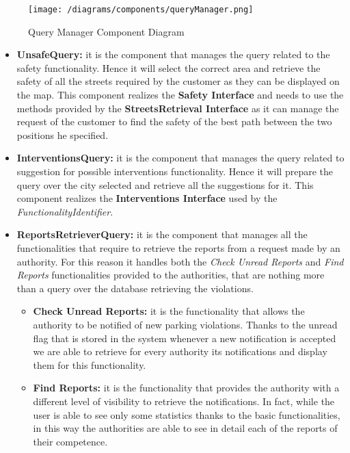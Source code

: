 			\begin{figure}[ht]
				\centering
				\texttt{[image: /diagrams/components/queryManager.png]}
				\caption{\label{fig:queryManagerComp} Query Manager Component Diagram}
			\end{figure}
		
			\begin{itemize}
				\item \textbf{UnsafeQuery:} it is the component that manages the query related to the safety functionality. Hence it will select the correct area and retrieve the safety of all the streets required by the customer as they can be displayed on the map. This component realizes the \textbf{Safety Interface} and needs to use the methods provided by the \textbf{StreetsRetrieval Interface} as it can manage the request of the customer to find the safety of the best path between the two positions he specified.
				
				\item \textbf{InterventionsQuery:} it is the component that manages the query related to suggestion for possible interventions functionality. Hence it will prepare the query over the city selected and retrieve all the suggestions for it. This component realizes the \textbf{Interventions Interface} used by the \emph{FunctionalityIdentifier}.
				
				\item \textbf{ReportsRetrieverQuery:} it is the component that manages all the functionalities that require to retrieve the reports from a request made by an authority. For this reason it handles both the \emph{Check Unread Reports} and \emph{Find Reports} functionalities provided to the authorities, that are nothing more than a query over the database retrieving the violations. 
				
				\begin{itemize}
					\item \textbf{Check Unread Reports:} it is the functionality that allows the authority to be notified of new parking violations. Thanks to the unread flag that is stored in the system whenever a new notification is accepted we are able to retrieve for every authority its notifications and display them for this functionality.
					
					\item \textbf{Find Reports:} it is the functionality that provides the authority with a different level of visibility to retrieve the notifications. In fact, while the user is able to see only some statistics thanks to the basic functionalities, in this way the authorities are able to see in detail each of the reports of their competence.
				\end{itemize}
			

\end{itemize}
